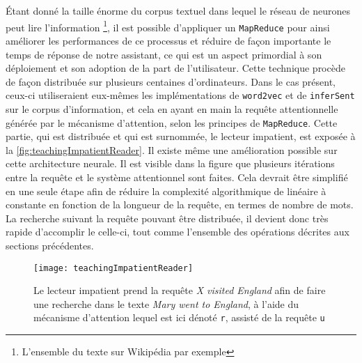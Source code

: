 Étant donné la taille énorme du corpus textuel dans lequel le réseau de neurones peut lire l’information \footnote{L’ensemble du texte sur Wikipédia par exemple}, il est possible d’appliquer un \texttt{MapReduce} \cite{DeanMapReduce} pour ainsi améliorer les performances de ce processus et réduire de façon importante le temps de réponse de notre assistant, ce qui est un aspect primordial à son déploiement et son adoption de la part de l'utilisateur. Cette technique procède de façon distribuée sur plusieurs centaines d’ordinateurs. Dans le cas présent, ceux-ci utiliseraient eux-mêmes les implémentations de \texttt{word2vec} et de \texttt{inferSent} sur le corpus d'information, et cela en ayant en main la requête attentionnelle générée par le mécanisme d'attention, selon les principes de \texttt{MapReduce}. Cette partie, qui est distribuée et qui est surnommée, le lecteur impatient, est exposée à la \autoref{fig:teachingImpatientReader}. Il existe même une amélioration possible sur cette architecture neurale. Il est visible dans la figure que plusieurs itérations entre la requête et le système attentionnel sont faites. Cela devrait être simplifié en une seule étape afin de réduire la complexité algorithmique de linéaire à constante en fonction de la longueur de la requête, en termes de nombre de mots. La recherche suivant la requête pouvant être distribuée, il devient donc très rapide d'accomplir le celle-ci, tout comme l'ensemble des opérations décrites aux sections précédentes.

\begin{figure*}
  \centering
  \texttt{[image: teachingImpatientReader]}
  \caption{Le lecteur impatient prend la requête \textit{X visited England} afin de faire une recherche dans le texte \textit{Mary went to England}, à l’aide du mécanisme d’attention lequel est ici dénoté \texttt{r}, assisté de la requête \texttt{u} \cite{readNcomprehend}}
  \label{fig:teachingImpatientReader}
\end{figure*}
